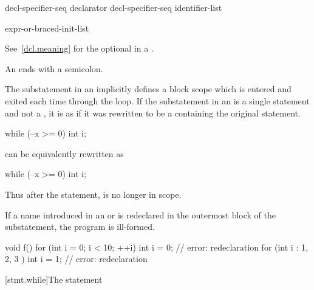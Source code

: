 \begin{bnf}
\br
     decl-specifier-seq declarator\br
     decl-specifier-seq  \terminal{[} identifier-list \terminal{]}
\end{bnf}

\begin{bnf}
\br
    expr-or-braced-init-list
\end{bnf}

See~\ref{dcl.meaning} for the optional  in a
.
\begin{note}
An  ends with a semicolon.
\end{note}

\pnum
{}%
The substatement in an  implicitly defines
a block scope which is entered and exited each time
through the loop.
If the substatement in an  is
a single statement and not a ,
it is as if it was rewritten to be
a  containing the original statement.
\begin{example}
\begin{codeblock}
while (--x >= 0)
  int i;
\end{codeblock}
can be equivalently rewritten as
\begin{codeblock}
while (--x >= 0) {
  int i;
}
\end{codeblock}

Thus after the  statement,  is no longer in scope.
\end{example}

\pnum
If a name introduced in an
 or 
is redeclared in the outermost block of the substatement, the program is ill-formed.
\begin{example}
\begin{codeblock}
void f() {
  for (int i = 0; i < 10; ++i)
    int i = 0;          // error: redeclaration
  for (int i : { 1, 2, 3 })
    int i = 1;          // error: redeclaration
}
\end{codeblock}
\end{example}

[stmt.while]{The  statement}%


